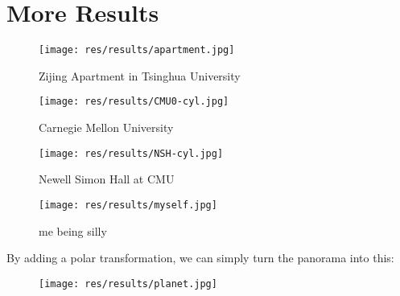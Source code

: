 
\section{More Results}
\begin{figure}[H]
  \centering
  \texttt{[image: res/results/apartment.jpg]}
  \caption{Zijing Apartment in Tsinghua University}
\end{figure}

\begin{figure}[H]
  \centering
  \texttt{[image: res/results/CMU0-cyl.jpg]}
  \caption{Carnegie Mellon University}
\end{figure}

\begin{figure}[H]
  \centering
  \texttt{[image: res/results/NSH-cyl.jpg]}
  \caption{Newell Simon Hall at CMU}
\end{figure}
\begin{figure}[H]
  \centering
  \texttt{[image: res/results/myself.jpg]}
  \caption{me being silly}
\end{figure}

\newpage
By adding a polar transformation, we can simply turn the panorama into this:

\begin{figure}[H]
  \centering
  \texttt{[image: res/results/planet.jpg]}
\end{figure}
